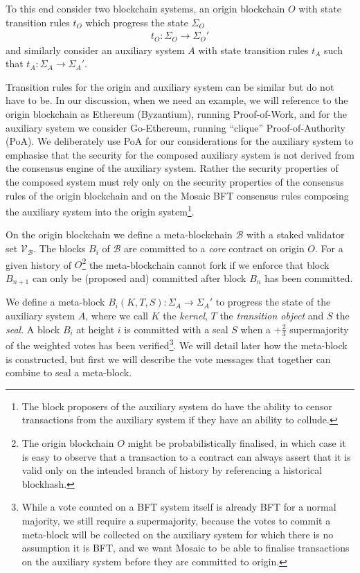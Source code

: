 \documentclass[12pt,a4paper]{article}
\begin{document}
To this end consider two blockchain systems, an origin blockchain $O$ with state transition rules $t_O$ which progress the state $\Sigma_O$ 
\begin{align*}
  t_O : \Sigma_O \rightarrow \Sigma_O'
\end{align*}
and similarly consider an auxiliary system $A$ with state transition rules $t_A$ such that $t_A : \Sigma_A \rightarrow \Sigma_A'$.

Transition rules for the origin and auxiliary system can be similar but do not have to be. In our discussion, when we need an example, we will reference to the origin blockchain as Ethereum (Byzantium), running Proof-of-Work, and for the auxiliary system we consider Go-Ethereum, running ``clique'' Proof-of-Authority (PoA).  We deliberately use PoA for our considerations for the auxiliary system to emphasise that the security for the composed auxiliary system is not derived from the consensus engine of the auxiliary system. Rather the security properties of the composed system must rely only on the security properties of the consensus rules of the origin blockchain and on the Mosaic BFT consensus rules composing the auxiliary system into the origin system\footnote{The block proposers of the auxiliary system do have the ability to censor transactions from the auxiliary system if they have an ability to collude.}.

On the origin blockchain we define a meta-blockchain $\mathcal{B}$ with a staked validator set $\mathcal{V}_\mathcal{B}$. The blocks $B_i$ of $\mathcal{B}$ are committed to a \emph{core} contract on origin $O$. For a given history of $O$\footnote{The origin blockchain $O$ might be probabilistically finalised, in which case it is easy to observe that a transaction to a contract can always assert that it is valid only on the intended branch of history by referencing a historical blockhash.} the meta-blockchain cannot fork if we enforce that block $B_{n+1}$ can only be (proposed and) committed after block $B_n$ has been committed.

We define a meta-block $B_i(K, T, S): \Sigma_A \rightarrow \Sigma_A'$ to progress the state of the auxiliary system $A$, where we call $K$ the \emph{kernel}, $T$ the \emph{transition object} and $S$ the \emph{seal}.  A block $B_i$ at height $i$ is committed with a seal $S$ when a $+\tfrac{2}{3}$ supermajority of the weighted votes has been verified\footnote{While a vote counted on a BFT system itself is already BFT for a normal majority, %
we still require a supermajority, because the votes to commit a meta-block will be collected on the auxiliary system for which there is no assumption it is BFT, and we want Mosaic to be able to finalise transactions on the auxiliary system before they are committed to origin.}. We will detail later how the meta-block is constructed, but first we will describe the vote messages that together can combine to seal a meta-block.
\end{document}
